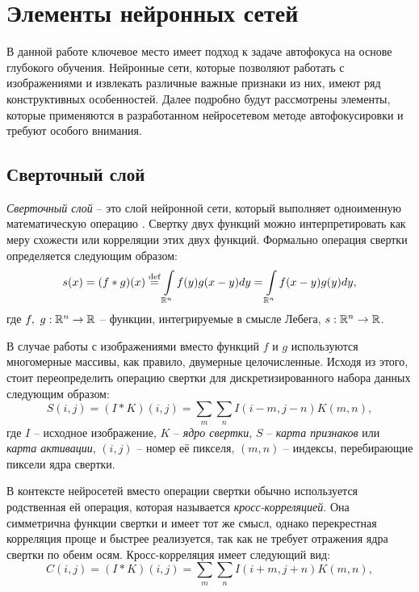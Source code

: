 \section{Элементы нейронных сетей}
В данной работе ключевое место имеет подход к задаче автофокуса на основе глубокого обучения. Нейронные сети, которые позволяют работать с изображениями и извлекать различные важные признаки из них, имеют ряд конструктивных особенностей. Далее подробно будут рассмотрены элементы, которые применяются в разработанном нейросетевом методе автофокусировки и требуют особого внимания.

\subsection{Сверточный слой} \label{par:convolution}
\textit{Сверточный слой} -- это слой нейронной сети, который выполняет одноименную математическую операцию \cite{goodfellow2016deep}. Свертку двух функций можно интерпретировать как меру схожести или корреляции этих двух функций. Формально операция свертки определяется следующим образом:
\begin{equation}
	s(x) = (f*g)(x) \stackrel{\text{def}}{=} \int\limits_{\RR^n} f(y)g(x-y)dy = \int\limits_{\RR^n} f(x-y)g(y)dy,
\end{equation}
где $f,\ g:\RR^n \rightarrow \RR$ -- функции, интегрируемые в смысле Лебега, $s:\RR^n \rightarrow \RR$.

В случае работы с изображениями вместо функций $f \text{ и } g$ используются многомерные массивы, как правило, двумерные целочисленные. Исходя из этого, стоит переопределить операцию свертки для дискретизированного набора данных следующим образом:
\begin{equation}
	S(i,j) = (I*K)(i,j) = \sum\limits_m \sum\limits_n I(i-m,j-n)K(m,n),
\end{equation}
где $I$ -- исходное изображение, $K$ -- \textit{ядро свертки}, $S$ -- \textit{карта признаков} или \textit{карта активации}, $(i,j)$ -- номер её пикселя, $(m,n)$ -- индексы, перебирающие пиксели ядра свертки.

В контексте нейросетей вместо операции свертки обычно используется родственная ей операция, которая называется \textit{кросс-корреляцией}. Она симметрична функции свертки и имеет тот же смысл, однако перекрестная корреляция проще и быстрее реализуется, так как не требует отражения ядра свертки по обеим осям. Кросс-корреляция имеет следующий вид:
\begin{equation}
	C(i,j) = (I*K)(i,j) = \sum\limits_m \sum\limits_n I(i+m,j+n)K(m,n),
	\label{eq:cross-correlation}
\end{equation}

